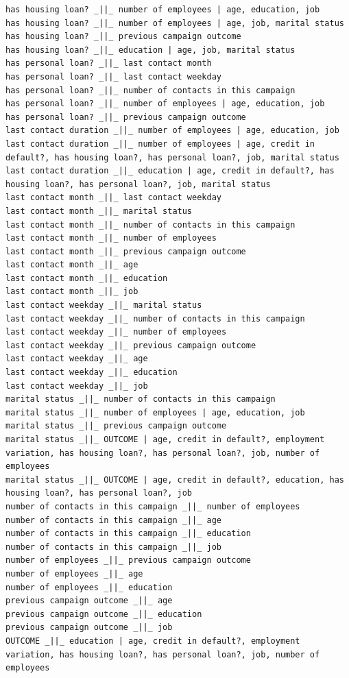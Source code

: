 \documentclass[11pt]{article}
\begin{document}
{\begin{verbatim}
has housing loan? _||_ number of employees | age, education, job
has housing loan? _||_ number of employees | age, job, marital status
has housing loan? _||_ previous campaign outcome
has housing loan? _||_ education | age, job, marital status
has personal loan? _||_ last contact month
has personal loan? _||_ last contact weekday
has personal loan? _||_ number of contacts in this campaign
has personal loan? _||_ number of employees | age, education, job
has personal loan? _||_ previous campaign outcome
last contact duration _||_ number of employees | age, education, job
last contact duration _||_ number of employees | age, credit in default?, has housing loan?, has personal loan?, job, marital status
last contact duration _||_ education | age, credit in default?, has housing loan?, has personal loan?, job, marital status
last contact month _||_ last contact weekday
last contact month _||_ marital status
last contact month _||_ number of contacts in this campaign
last contact month _||_ number of employees
last contact month _||_ previous campaign outcome
last contact month _||_ age
last contact month _||_ education
last contact month _||_ job
last contact weekday _||_ marital status
last contact weekday _||_ number of contacts in this campaign
last contact weekday _||_ number of employees
last contact weekday _||_ previous campaign outcome
last contact weekday _||_ age
last contact weekday _||_ education
last contact weekday _||_ job
marital status _||_ number of contacts in this campaign
marital status _||_ number of employees | age, education, job
marital status _||_ previous campaign outcome
marital status _||_ OUTCOME | age, credit in default?, employment variation, has housing loan?, has personal loan?, job, number of employees
marital status _||_ OUTCOME | age, credit in default?, education, has housing loan?, has personal loan?, job
number of contacts in this campaign _||_ number of employees
number of contacts in this campaign _||_ age
number of contacts in this campaign _||_ education
number of contacts in this campaign _||_ job
number of employees _||_ previous campaign outcome
number of employees _||_ age
number of employees _||_ education
previous campaign outcome _||_ age
previous campaign outcome _||_ education
previous campaign outcome _||_ job
OUTCOME _||_ education | age, credit in default?, employment variation, has housing loan?, has personal loan?, job, number of employees
\end{verbatim}}
\end{document}
